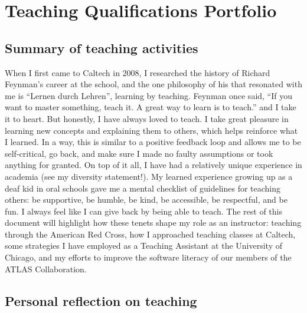 \chapter{Teaching Qualifications Portfolio} \label{chap:teaching-qualifications-portfolio}

\section{Summary of teaching activities} \label{sec:summary-of-teaching-activities}

When I first came to Caltech in 2008, I researched the history of Richard Feynman's career at the school, and the one philosophy of his that resonated with me is \enquote{Lernen durch Lehren}, learning by teaching. Feynman once said, \enquote{If you want to master something, teach it. A great way to learn is to teach.} and I take it to heart. But honestly, I have always loved to teach. I take great pleasure in learning new concepts and explaining them to others, which helps reinforce what I learned. In a way, this is similar to a positive feedback loop and allows me to be self-critical, go back, and make sure I made no faulty assumptions or took anything for granted. On top of it all, I have had a relatively unique experience in academia (see my diversity statement!). My learned experience growing up as a deaf kid in oral schools gave me a mental checklist of guidelines for teaching others: be supportive, be humble, be kind, be accessible, be respectful, and be fun. I always feel like I can give back by being able to teach. The rest of this document will highlight how these tenets shape my role as an instructor: teaching through the American Red Cross, how I approached teaching classes at Caltech, some strategies I have employed as a Teaching Assistant at the University of Chicago, and my efforts to improve the software literacy of our members of the ATLAS Collaboration.

\section{Personal reflection on teaching} \label{sec:personal-reflection-on-teaching}


